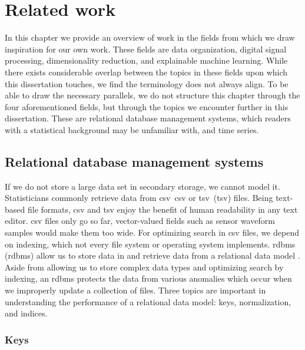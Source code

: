 \chapter{Related work}

In this chapter we provide an overview of work in the fields from which we draw inspiration for our own work.
These fields are data organization, digital signal processing, dimensionality reduction, and explainable machine learning.
While there exists considerable overlap between the topics in these fields upon which this dissertation touches, we find the terminology does not always align.
To be able to draw the necessary parallels, we do not structure this chapter through the four aforementioned fields, but through the topics we encounter further in this dissertation.
These are relational database management systems, which readers with a statistical background may be unfamiliar with, and time series.

\section{Relational database management systems}

If we do not store a large data set in secondary storage, we cannot model it.
Statisticians commonly retrieve data from \acrlong{csv}~\acrshort{csv} \citep{DBLP:journals/rfc/rfc4180} or \acrlong{tsv}~(\acrshort{tsv}) \citep{tsv} files.
Being text-based file formats, \acrshort{csv} and \acrshort{tsv} enjoy the benefit of human readability in any text editor.
\acrshort{csv} files only go so far, vector-valued fields such as sensor waveform samples would make them too wide.
For optimizing search in \acrshort{csv} files, we depend on indexing, which not every file system or operating system implements.
\Acrlong{rdbms} (\acrshort{rdbms}) allow us to store data in and retrieve data from a relational data model \citep{DBLP:journals/cacm/Codd70}.
Aside from allowing us to store complex data types and optimizing search by indexing, an \acrshort{rdbms} protects the data from various anomalies which occur when we improperly update a collection of files.
Three topics are important in understanding the performance of a relational data model: keys, normalization, and indices.

\subsection{Keys}%

